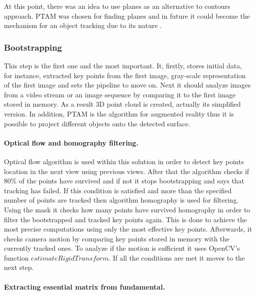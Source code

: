 \documentclass[../../main]{subfiles}
\begin{document}
At this point, there was an idea to use planes as an alternative to contours approach. \ac{PTAM} was chosen for finding planes and in future it could become the mechanism for an object tracking due to its nature \cite{puzzle_games_solver_q3_zakharov}.

\subsubsection{Bootstrapping}

This step is the first one and the most important. It, firstly, stores initial data, for instance, extracted key points from the first image, gray-scale representation of the first image and sets the pipeline to move on. Next it should analyze images from a video stream or an image sequence by comparing it to the first image stored in memory. As a result 3D point cloud is created, actually its simplified version. In addition, \ac{PTAM} is the algorithm for augmented reality thus it is possible to project different objects onto the detected surface.

\paragraph*{Optical flow and homography filtering.}

Optical flow algorithm is used within this solution in order to detect key points location in the next view using previous views. After that the algorithm checks if 80\% of the points have survived and if not it stops bootstrapping and says that tracking has failed. If this condition is satisfied and more than the specified number of points are tracked then algorithm homography is used for filtering. Using the mask it checks how many points have survived homography in order to filter the bootstrapped and tracked key points again. This is done to achieve the most precise computations using only the most effective key points. Afterwards, it checks camera motion by comparing key points stored in memory with the currently tracked ones. To analyze if the motion is sufficient it uses \ac{OpenCV}'s function $estimateRigidTransform$. If all the conditions are met it moves to the next step.

\paragraph*{Extracting essential matrix from fundamental.}
\end{document}
